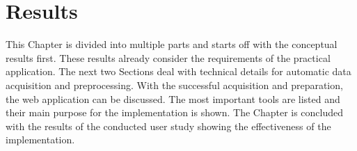 \section{Results}
\label{s:results}
\cbstart
This Chapter is divided into multiple parts and starts off with the conceptual results first. These results already consider the requirements of the practical application. The next two Sections deal with technical details for automatic data acquisition and preprocessing.
With the successful acquisition and preparation, the web application can be discussed. The most important tools are listed and their main purpose for the implementation is shown. The Chapter is concluded with the results of the conducted user study showing the effectiveness of the implementation.
\cbend


